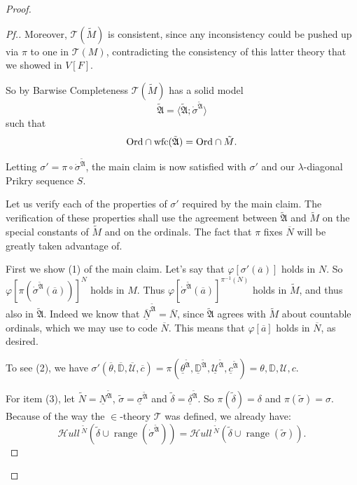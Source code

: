\documentclass{amsart}
\theoremstyle{definition}
\theoremstyle{remark}
\newcommand{\D}{\mathbb{D}}
\newcommand{\N}{{\overline{N}}}
\newcommand{\U}{\mathcal{U}}
\newcommand{\Ord}{\textup{\ensuremath{\text{Ord}}}}
\DeclareMathOperator{\ran}{range}
\newcommand{\SH}{\mathcal{H}\textit{ull} \,}
\newcommand{\sk}[3]{\SH^{#1}( {#2} \cup {\ran(#3)} ) }
\begin{document}
\begin{proof}
\begin{proof}[Pf.]
Moreover, $\mathcal T(\tilde M)$ is consistent, since any inconsistency could be pushed up via $\pi$ to one in $\mathcal T(M)$, contradicting the consistency of this latter theory that we showed in $V[F]$.

So by Barwise Completeness $\mathcal T(\tilde M)$ has a solid model $$\tilde{\mathfrak A} = \langle \tilde{\mathfrak A}; \dot{\sigma}^{\tilde{\mathfrak A}} \rangle$$ such that $$\text{Ord} \cap \text{wfc}(\tilde{\mathfrak A}) = \Ord \cap \tilde M.$$ 

Letting $\sigma'=\pi \circ \dot{\sigma}^{\tilde{\mathfrak A}}$, the main claim is now satisfied with $\sigma'$ and our $\lambda$-diagonal Prikry sequence $S$.

Let us verify each of the properties of $\sigma'$ required by the main claim. The verification of these properties shall use the agreement between $\tilde{\mathfrak A}$ and $\tilde M$ on the special constants of $\tilde M$ and on the ordinals. The fact that $\pi$ fixes $\N$ will be greatly taken advantage of.

First we show (1) of the main claim. Let's say that $\varphi[\sigma'(\overline a)]$ holds in $N$. So $\varphi[\pi(\dot \sigma^{\tilde{\mathfrak A}}(\overline a))]^N$ holds in $M$. Thus $\varphi[\dot \sigma^{\tilde{\mathfrak A}}(\overline a)]^{\pi^{-1}(N)}$ holds in $\tilde M$, and thus also in $\tilde{\mathfrak A}$. Indeed we know that $\underline{\N}^{\tilde{\mathfrak A}} = \N$, since $\tilde{\mathfrak A}$ agrees with $\tilde M$ about countable ordinals, which we may use to code $\N$. 
This means that $\varphi[\overline a]$ holds in $\N$, as desired.

To see (2), we have $\sigma'(\overline \theta, \overline{\D}, \overline{\U}, \overline c)= \pi(\underline{\theta}^{\tilde{\mathfrak A}}, \underline{\D}^{\tilde{\mathfrak A}}, \underline{\U}^{\tilde{\mathfrak A}}, \underline{c}^{\tilde{\mathfrak A}})=\theta, \D, \U, c$.

For item (3), let $\tilde N = \underline N^{\tilde{\mathfrak A}}$, $\tilde \sigma = \underline \sigma^{\tilde{\mathfrak A}}$ and $\tilde \delta = \underline{\delta}^{\tilde{\mathfrak A}}$. So $\pi(\tilde \delta)= \delta$ and $\pi(\tilde \sigma)=\sigma$. Because of the way the $\in$-theory $\mathcal T$ was defined, we already have: 
\begin{equation}\label{eqn:SkDotSigma=SkTildeSigma} \sk{\tilde N}{\tilde \delta}{\dot \sigma^{\tilde{\mathfrak A}}} = \sk{\tilde N}{\tilde \delta}{\tilde \sigma}. \end{equation}


\end{proof}
\end{proof}
\end{document}
